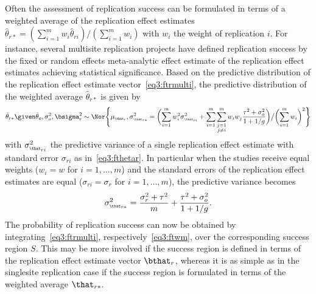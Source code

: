 Often the assessment of replication success can be formulated in terms of a
weighted average of the replication effect estimates
$\hat{\theta}_{r*} = (\sum_{i = 1}^{m} w_{i} \hat{\theta}_{ri})/(\sum_{i = 1}^{m} w_{i})$
with $w_{i}$ the weight of replication $i$. For instance, several multisite
replication projects \citep[\eg][]{Klein2018} have defined replication success
by the fixed or random effects meta-analytic effect estimate of the replication
effect estimates achieving statistical significance. Based on the predictive
distribution of the replication effect estimate vector~\eqref{eq3:ftrmulti}, the
predictive distribution of the weighted average $\hat{\theta}_{r*}$ is given by
\begin{align}
  \hat{\theta}_{r*} \given \hat{\theta}_o, \sigma^{2}_{o}, \bsigma^{2}_{r}
  \sim \Nor\Biggl\{
  \mu_{\scriptscriptstyle \that_{r}},
  \sigma^{2}_{\scriptscriptstyle \that_{r*}} =
  \biggl(\sum_{i=1}^{m} w_{i}^{2} \sigma^{2}_{\scriptscriptstyle \that_{ri}} +
  \sum_{i=1}^{m}\sum_{\substack{j =1 \\ j\neq i}}^{m} w_{i}w_{j}
\frac{\tau^{2} + \sigma^{2}_{o}}{1 + 1/g} \biggr)\big/\biggl(\sum_{i=1}^{m} w_{i}\biggr)^{2} \Biggr\}
  \label{eq3:ftwm}
\end{align}
with $\sigma^{2}_{\scriptscriptstyle \that_{ri}}$ the predictive variance of a
single replication effect estimate with standard error $\sigma_{ri}$ as
in~\eqref{eq3:fthetar}. In particular when the studies receive equal weights
($w_{i} = w$ for $i = 1, \dots, m$) and the standard errors of the replication
effect estimates are equal ($\sigma_{ri} = \sigma_{r}$ for $i = 1, \dots, m$),
the predictive variance becomes
\begin{align}
  \sigma^{2}_{\scriptscriptstyle \that_{r*}} =
  \frac{\sigma^{2}_{r} + \tau^{2}}{m} + \frac{\tau^{2} + \sigma^{2}_{o}}{1 + 1/g}.
  \label{eq3:predvarequal}
\end{align}
The probability of replication success can now be obtained by
integrating~\eqref{eq3:ftrmulti}, respectively~\eqref{eq3:ftwm}, over the
corresponding success region $S$. This may be more involved if the success
region is defined in terms of the replication effect estimate vector
$\bthat_{r}$, whereas it is as simple as in the singlesite replication case if
the success region is formulated in terms of the weighted average $\that_{r*}$.


